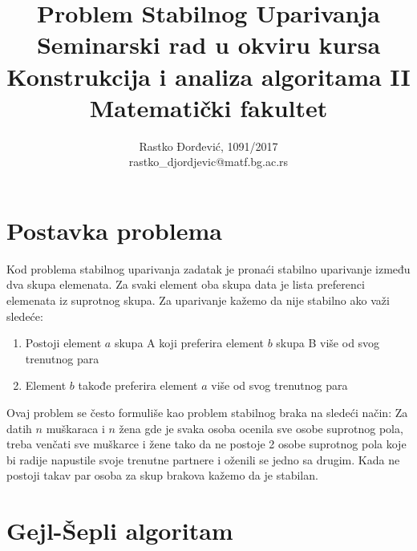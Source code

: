 \documentclass[a4paper]{article}
\begin{document}
\title{Problem Stabilnog Uparivanja\\ \small{Seminarski rad u okviru kursa\\Konstrukcija i analiza algoritama II\\ Matematički fakultet}}

\author{Rastko Đorđević, 1091/2017\\ rastko\_djordjevic@matf.bg.ac.rs}
\maketitle


\tableofcontents

\newpage



\section{Postavka problema}

Kod problema stabilnog uparivanja zadatak je pronaći stabilno uparivanje između dva skupa elemenata. Za svaki element oba skupa data je lista preferenci elemenata iz suprotnog skupa. Za uparivanje kažemo da nije stabilno ako važi sledeće:
\begin{enumerate}
	\item Postoji element $a$ skupa A koji preferira element $b$ skupa B više od svog trenutnog para
	\item Element $b$ takođe preferira element $a$ više od svog trenutnog para
\end{enumerate}

Ovaj problem se često formuliše kao problem stabilnog braka na sledeći način: Za datih $n$ muškaraca i $n$ žena gde je svaka osoba ocenila sve osobe suprotnog pola, treba venčati sve muškarce i žene tako da ne postoje 2 osobe suprotnog pola koje bi radije napustile svoje trenutne partnere i oženili se jedno sa drugim. Kada ne postoji takav par osoba za skup brakova kažemo da je stabilan.

\section{Gejl-Šepli algoritam}
\end{document}
